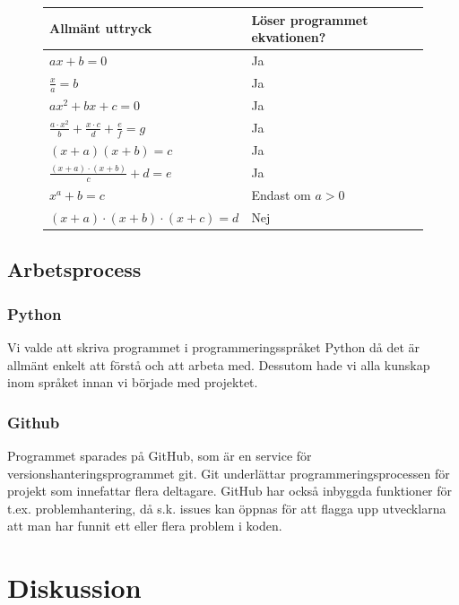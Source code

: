 \documentclass[12pt,a4paper]{article}
\begin{document}
\begin{figure}[h!]
  \centering
  \begin{tabular}{l|l}
    \textbf{Allmänt uttryck} & \textbf{Löser programmet ekvationen?} \\
    \hline
    \(ax+b=0\) & Ja \\
    \(\frac{x}{a}=b\) & Ja \\
    \(ax^2+bx+c=0\) & Ja \\
    \(\frac{a \cdot x^2}{b}+\frac{x \cdot c}{d}+\frac{e}{f}=g\) & Ja \\
    \((x+a)(x+b)=c\) & Ja \\
    \(\frac{(x+a)\cdot(x+b)}{c}+d=e\) & Ja \\
    \(x^a+b=c\) & Endast om \( a>0 \) \\
    \((x+a)\cdot(x+b)\cdot(x+c)=d\) & Nej 
  \end{tabular}
  \label{tab:lexer_patterns}
\end{figure}
\newpage
\subsection{Arbetsprocess}
\subsubsection{Python}
Vi valde att skriva programmet i programmeringsspråket Python då det är allmänt enkelt att förstå och att arbeta med. Dessutom hade vi alla kunskap inom språket innan vi började med projektet.

\subsubsection{Github}
Programmet sparades på GitHub, som är en service för versionshanteringsprogrammet git. Git underlättar programmeringsprocessen för projekt som innefattar flera deltagare. GitHub har också inbyggda funktioner för t.ex. problemhantering, då s.k. issues kan öppnas för att flagga upp utvecklarna att man har funnit ett eller flera problem i koden.

\section{Diskussion}
\end{document}
